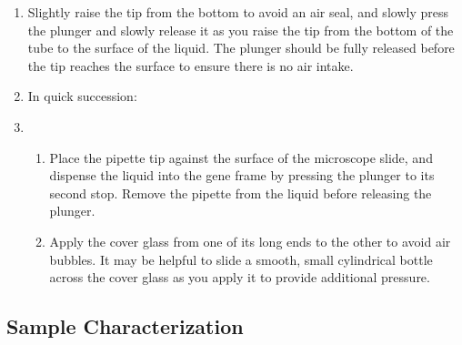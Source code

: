 \begin{enumerate}
    \item Slightly raise the tip from the bottom to avoid an air seal, and slowly press the plunger and slowly release it as you raise the tip from the bottom of the tube to the surface of the liquid. The plunger should be fully released before the tip reaches the surface to ensure there is no air intake.
    \item In quick succession:
    \item \begin{enumerate}
        \item Place the pipette tip against the surface of the microscope slide, and dispense the liquid into the gene frame by pressing the plunger to its second stop. Remove the pipette from the liquid before releasing the plunger.
        \item Apply the cover glass from one of its long ends to the other to avoid air bubbles. It may be helpful to slide a smooth, small cylindrical bottle across the cover glass as you apply it to provide additional pressure.
    \end{enumerate}
\end{enumerate}

\subsection{Sample Characterization}
